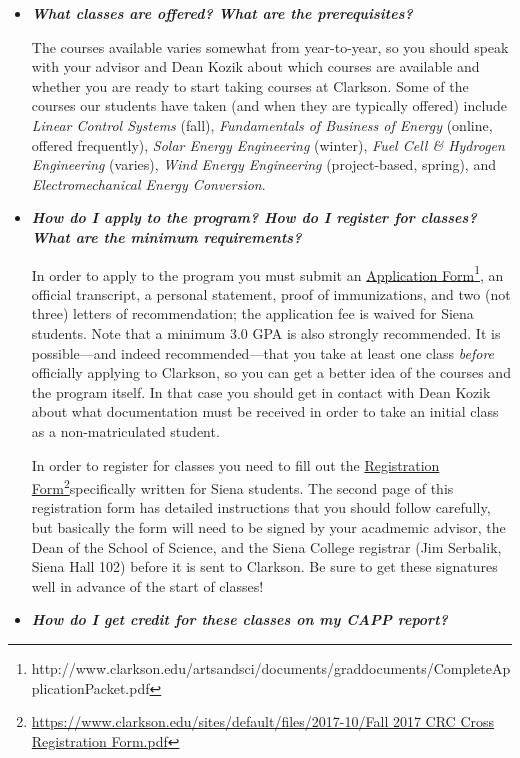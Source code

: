 \documentclass[12pt]{article}
\begin{document}
\begin{itemize}
\item{{\bf {\em What classes are offered?  What are the prerequisites?}}

The courses available varies somewhat from year-to-year, so you should speak
with your advisor and Dean Kozik about which courses are available and whether
you are ready to start taking courses at Clarkson.  Some of the courses our
students have taken (and when they are typically offered) include {\em Linear
  Control Systems} (fall), {\em Fundamentals of Business of Energy} (online,
offered frequently), {\em Solar Energy Engineering} (winter), {\em Fuel Cell \&
  Hydrogen Engineering} (varies), {\em Wind Energy Engineering} (project-based,
spring), and {\em Electromechanical Energy Conversion}.}

\item{{\bf {\em How do I apply to the program?  How do I register for classes?
      What are the minimum requirements?}}

In order to apply to the program you must submit an \underline{Application
  Form}\footnote{http://www.clarkson.edu/artsandsci/documents/graddocuments/CompleteApplicationPacket.pdf},
an official transcript, a personal statement, proof of immunizations, and two
(not three) letters of recommendation; the application fee is waived for Siena
students.  Note that a minimum 3.0 GPA is also strongly recommended.  It is
possible---and indeed recommended---that you take at least one class
\emph{before} officially applying to Clarkson, so you can get a better idea of
the courses and the program itself.  In that case you should get in contact with
Dean Kozik about what documentation must be received in order to take an initial
class as a non-matriculated student.

In order to register for classes you need to fill out the
\underline{Registration
  Form}\footnote{\url{https://www.clarkson.edu/sites/default/files/2017-10/Fall 2017 CRC Cross Registration Form.pdf}}specifically written for Siena
students.  The second page of this registration form has detailed instructions
that you should follow carefully, but basically the form will need to be signed
by your acadmemic advisor, the Dean of the School of Science, and the Siena
College registrar (Jim Serbalik, Siena Hall 102) before it is sent to Clarkson.
Be sure to get these signatures well in advance of the start of classes!}

\item{{\bf {\em How do I get credit for these classes on my CAPP report?}}

}
\end{itemize}
\end{document}

